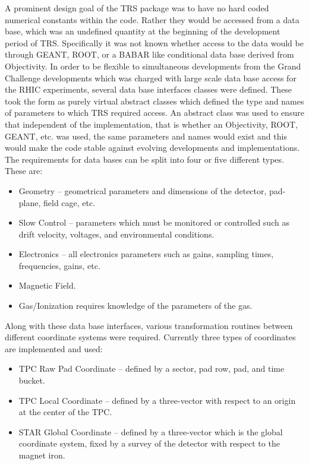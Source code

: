 \documentclass[twoside]{article}
\newcommand{\name}[1]{\textsf{#1}}%
\begin{document}
A prominent design goal of the \name{TRS} package was to have
no hard coded numerical constants within the code.  Rather
they would be accessed from a data 
base, which was an undefined quantity at the beginning of the
development period of \name{TRS}. 
Specifically it was not known whether 
access to the data would be through GEANT, ROOT, or a BABAR like 
conditional data base derived from Objectivity. 
In order to be flexible to simultaneous developments from the
Grand Challenge developments  which was
charged with large scale data base access for the RHIC experiments,
several data base interfaces classes were defined.  These took the 
form as purely virtual abstract classes which defined the type and 
names of parameters to which \name{TRS} required access.  An abstract class
was used to ensure that independent of the implementation, that is
whether an Objectivity,  ROOT, GEANT, etc. was
used, the same parameters and names would exist and this would make
the code stable against evolving developments and implementations.
The requirements for data bases can be split into four or five 
different types.  These are:
\begin{itemize}
   \item Geometry -- geometrical parameters and dimensions of the
         detector, pad-plane, field cage, etc.
   \item Slow Control -- parameters which must be monitored or
         controlled such as drift velocity, voltages, and environmental
         conditions.
   \item Electronics -- all electronics parameters such as gains,
         sampling times, frequencies, gains, etc.
   \item Magnetic Field.
   \item Gas/Ionization requires knowledge of the parameters
         of the gas.
\end{itemize}

Along with these data base interfaces, various transformation routines
between different coordinate systems were required.  Currently
three types of coordinates are implemented and used: 
\begin{itemize}
   \item TPC Raw Pad Coordinate -- defined by a sector, pad row, pad, 
         and time bucket.
   \item TPC Local Coordinate -- defined by a three-vector with respect 
         to an origin at the center of the TPC.
   \item STAR Global Coordinate -- defined by a three-vector which is the
         global coordinate system, fixed by a survey  of the detector
         with respect to the magnet iron.
\end{itemize}
\end{document}
